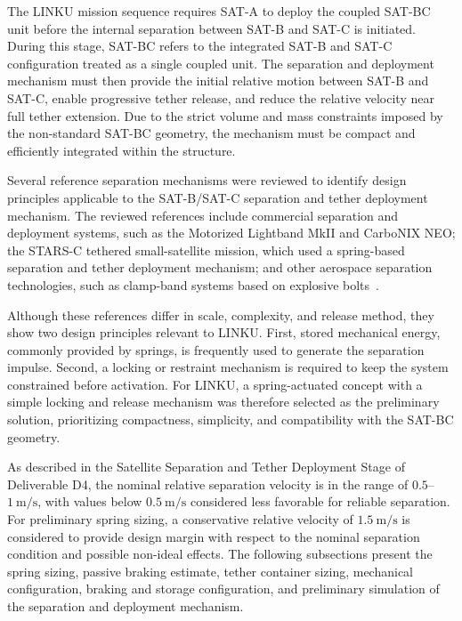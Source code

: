 The LINKU mission sequence requires SAT-A to deploy the coupled SAT-BC unit before the internal separation between SAT-B and SAT-C is initiated. During this stage, SAT-BC refers to the integrated SAT-B and SAT-C configuration treated as a single coupled unit. The separation and deployment mechanism must then provide the initial relative motion between SAT-B and SAT-C, enable progressive tether release, and reduce the relative velocity near full tether extension. Due to the strict volume and mass constraints imposed by the non-standard SAT-BC geometry, the mechanism must be compact and efficiently integrated within the structure.

Several reference separation mechanisms were reviewed to identify design principles applicable to the SAT-B/SAT-C separation and tether deployment mechanism. The reviewed references include commercial separation and deployment systems, such as the Motorized Lightband MkII and CarboNIX NEO; the STARS-C tethered small-satellite mission, which used a spring-based separation and tether deployment mechanism; and other aerospace separation technologies, such as clamp-band systems based on explosive bolts~\cite{RocketLab2024MLB,Yamagiwa2017SpaceElevator,Cui2015SatelliteSeparation,Exolaunch2024CarboNIX}.

Although these references differ in scale, complexity, and release method, they show two design principles relevant to LINKU. First, stored mechanical energy, commonly provided by springs, is frequently used to generate the separation impulse. Second, a locking or restraint mechanism is required to keep the system constrained before activation. For LINKU, a spring-actuated concept with a simple locking and release mechanism was therefore selected as the preliminary solution, prioritizing compactness, simplicity, and compatibility with the SAT-BC geometry.

As described in the Satellite Separation and Tether Deployment Stage of Deliverable D4, the nominal relative separation velocity is in the range of \(0.5\)--\(1~\mathrm{m/s}\), with values below \(0.5~\mathrm{m/s}\) considered less favorable for reliable separation. For preliminary spring sizing, a conservative relative velocity of \(1.5~\mathrm{m/s}\) is considered to provide design margin with respect to the nominal separation condition and possible non-ideal effects. The following subsections present the spring sizing, passive braking estimate, tether container sizing, mechanical configuration, braking and storage configuration, and preliminary simulation of the separation and deployment mechanism.

